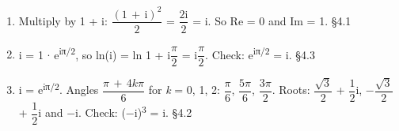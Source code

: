 \documentclass[11pt]{article}
\begin{document}
\begin{keepsection}
\begin{enumerate}
\item Multiply by 1 + i: {\small\ensuremath{\dfrac{(1\, +\, \mathrm{i})^{2}}{2}}} = {\small\ensuremath{\dfrac{2\mathrm{i}}{2}}} = i. So Re = 0 and Im = 1. \hfill{\small\color{FAUblue}§4.1}
\item i = 1 \ensuremath{\cdot} e\textsuperscript{iπ/2}, so ln(i) = ln 1 + i{\small\ensuremath{\dfrac{π}{2}}} = i{\small\ensuremath{\dfrac{π}{2}}}. Check: e\textsuperscript{iπ/2} = i. \hfill{\small\color{FAUblue}§4.3}
\item i = e\textsuperscript{iπ/2}. Angles {\small\ensuremath{\dfrac{π\, +\, 4{k}π}{6}}} for \textit{k} = 0, 1, 2: {\small\ensuremath{\dfrac{π}{6}}}, {\small\ensuremath{\dfrac{5π}{6}}}, {\small\ensuremath{\dfrac{3π}{2}}}. Roots: {\small\ensuremath{\dfrac{\sqrt{3}}{2}}} + {\small\ensuremath{\dfrac{1}{2}}}i, \ensuremath{-}{\small\ensuremath{\dfrac{\sqrt{3}}{2}}} + {\small\ensuremath{\dfrac{1}{2}}}i and \ensuremath{-}i. Check: (\ensuremath{-}i)\textsuperscript{3} = i. \hfill{\small\color{FAUblue}§4.2}
\end{enumerate}

\end{keepsection}
\end{document}
